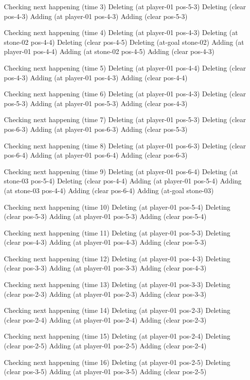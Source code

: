 Checking next happening (time 3)
Deleting (at player-01 pos-5-3)
Deleting (clear pos-4-3)
Adding (at player-01 pos-4-3)
Adding (clear pos-5-3)

Checking next happening (time 4)
Deleting (at player-01 pos-4-3)
Deleting (at stone-02 pos-4-4)
Deleting (clear pos-4-5)
Deleting (at-goal stone-02)
Adding (at player-01 pos-4-4)
Adding (at stone-02 pos-4-5)
Adding (clear pos-4-3)

Checking next happening (time 5)
Deleting (at player-01 pos-4-4)
Deleting (clear pos-4-3)
Adding (at player-01 pos-4-3)
Adding (clear pos-4-4)

Checking next happening (time 6)
Deleting (at player-01 pos-4-3)
Deleting (clear pos-5-3)
Adding (at player-01 pos-5-3)
Adding (clear pos-4-3)

Checking next happening (time 7)
Deleting (at player-01 pos-5-3)
Deleting (clear pos-6-3)
Adding (at player-01 pos-6-3)
Adding (clear pos-5-3)

Checking next happening (time 8)
Deleting (at player-01 pos-6-3)
Deleting (clear pos-6-4)
Adding (at player-01 pos-6-4)
Adding (clear pos-6-3)

Checking next happening (time 9)
Deleting (at player-01 pos-6-4)
Deleting (at stone-03 pos-5-4)
Deleting (clear pos-4-4)
Adding (at player-01 pos-5-4)
Adding (at stone-03 pos-4-4)
Adding (clear pos-6-4)
Adding (at-goal stone-03)

Checking next happening (time 10)
Deleting (at player-01 pos-5-4)
Deleting (clear pos-5-3)
Adding (at player-01 pos-5-3)
Adding (clear pos-5-4)

Checking next happening (time 11)
Deleting (at player-01 pos-5-3)
Deleting (clear pos-4-3)
Adding (at player-01 pos-4-3)
Adding (clear pos-5-3)

Checking next happening (time 12)
Deleting (at player-01 pos-4-3)
Deleting (clear pos-3-3)
Adding (at player-01 pos-3-3)
Adding (clear pos-4-3)

Checking next happening (time 13)
Deleting (at player-01 pos-3-3)
Deleting (clear pos-2-3)
Adding (at player-01 pos-2-3)
Adding (clear pos-3-3)

Checking next happening (time 14)
Deleting (at player-01 pos-2-3)
Deleting (clear pos-2-4)
Adding (at player-01 pos-2-4)
Adding (clear pos-2-3)

Checking next happening (time 15)
Deleting (at player-01 pos-2-4)
Deleting (clear pos-2-5)
Adding (at player-01 pos-2-5)
Adding (clear pos-2-4)

Checking next happening (time 16)
Deleting (at player-01 pos-2-5)
Deleting (clear pos-3-5)
Adding (at player-01 pos-3-5)
Adding (clear pos-2-5)

